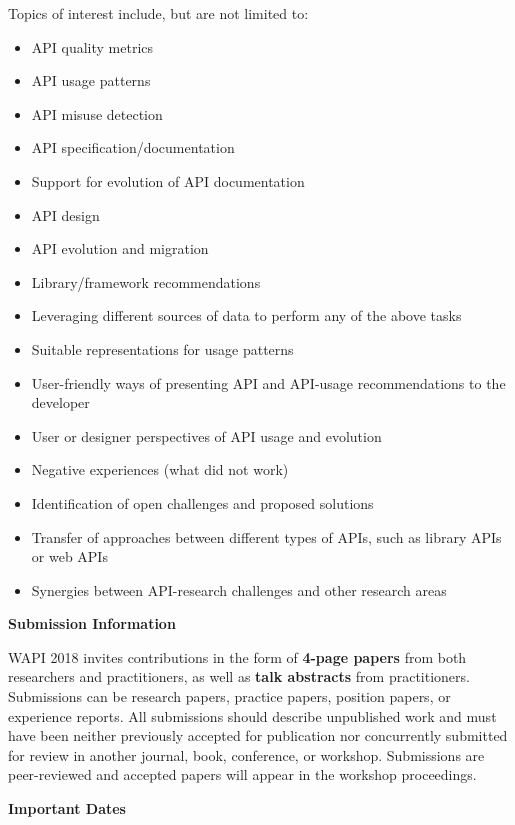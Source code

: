 \documentclass[sigconf]{acmart}
\newcommand{\shortname}{WAPI}
\begin{document}
Topics of interest include, but are not limited to:
\begin{itemize}
\setlength\itemsep{5pt}

\item API quality metrics
\item API usage patterns
\item API misuse detection
\item API specification/documentation
\item Support for evolution of API documentation
\item API design
\item API evolution and migration
\item Library/framework recommendations
\item Leveraging different sources of data to perform any of the above tasks
\item Suitable representations for usage patterns
\item User-friendly ways of presenting API and API-usage recommendations to the developer
\item User or designer perspectives of API usage and evolution
\item Negative experiences (what did not work)
\item Identification of open challenges and proposed solutions
\item Transfer of approaches between different types of APIs, such as library APIs or web APIs
\item Synergies between API-research challenges and other research areas  
\end{itemize}


\vspace{0.2cm}
\noindent
\textbf{\large Submission Information}
\vspace{0.2cm}

\shortname{} 2018 invites contributions in the form of \textbf{4-page papers} from both researchers and practitioners, as well as \textbf{talk abstracts} from practitioners. Submissions can be research papers, practice papers, position papers, or experience reports. All submissions should describe unpublished work and must have been neither previously accepted for publication nor concurrently submitted for review in another journal, book, conference, or workshop. Submissions are peer-reviewed and accepted papers will appear in the workshop proceedings.

\vspace{0.2cm}
\noindent
\textbf{\large Important Dates}
\vspace{0.2cm}
\end{document}
